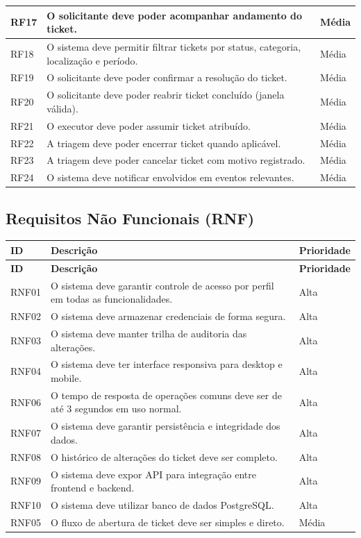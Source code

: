 \documentclass[12pt,a4paper]{article}
\begin{document}
\begin{longtable}{|>{\raggedright\arraybackslash}p{1.6cm}|>{\raggedright\arraybackslash}p{9.8cm}|>{\raggedright\arraybackslash}p{2.3cm}|}
RF17 & O solicitante deve poder acompanhar andamento do ticket. & Média \\ \hline
RF18 & O sistema deve permitir filtrar tickets por status, categoria, localização e período. & Média \\ \hline
RF19 & O solicitante deve poder confirmar a resolução do ticket. & Média \\ \hline
RF20 & O solicitante deve poder reabrir ticket concluído (janela válida). & Média \\ \hline
RF21 & O executor deve poder assumir ticket atribuído. & Média \\ \hline
RF22 & A triagem deve poder encerrar ticket quando aplicável. & Média \\ \hline
RF23 & A triagem deve poder cancelar ticket com motivo registrado. & Média \\ \hline
RF24 & O sistema deve notificar envolvidos em eventos relevantes. & Média \\ \hline
\end{longtable}

\subsection{Requisitos Não Funcionais (RNF)}

\begin{longtable}{|>{\raggedright\arraybackslash}p{1.6cm}|>{\raggedright\arraybackslash}p{9.8cm}|>{\raggedright\arraybackslash}p{2.3cm}|}
\hline
\textbf{ID} & \textbf{Descrição} & \textbf{Prioridade} \\ \hline
\endfirsthead
\hline
\textbf{ID} & \textbf{Descrição} & \textbf{Prioridade} \\ \hline
\endhead

RNF01 & O sistema deve garantir controle de acesso por perfil em todas as funcionalidades. & Alta \\ \hline
RNF02 & O sistema deve armazenar credenciais de forma segura. & Alta \\ \hline
RNF03 & O sistema deve manter trilha de auditoria das alterações. & Alta \\ \hline
RNF04 & O sistema deve ter interface responsiva para desktop e mobile. & Alta \\ \hline
RNF06 & O tempo de resposta de operações comuns deve ser de até 3 segundos em uso normal. & Alta \\ \hline
RNF07 & O sistema deve garantir persistência e integridade dos dados. & Alta \\ \hline
RNF08 & O histórico de alterações do ticket deve ser completo. & Alta \\ \hline
RNF09 & O sistema deve expor API para integração entre frontend e backend. & Alta \\ \hline
RNF10 & O sistema deve utilizar banco de dados PostgreSQL. & Alta \\ \hline
RNF05 & O fluxo de abertura de ticket deve ser simples e direto. & Média \\ \hline
\end{longtable}
\end{document}
